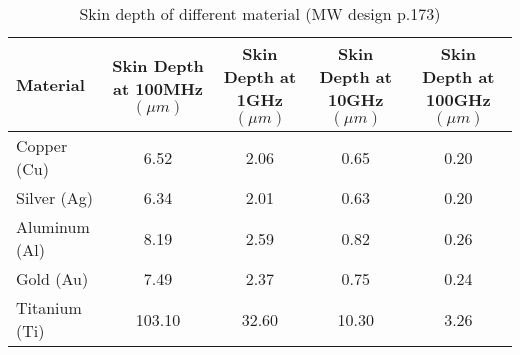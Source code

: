 \begin{table}
\caption{Skin depth of different material (MW design p.173)}
\begin{tabular}{l|c|c|c|c}
\toprule
Material & \makecell{Skin Depth\\at 100MHz $(\unit{\mu m})$} & \makecell{Skin Depth\\at 1GHz $(\unit{\mu m})$} & \makecell{Skin Depth\\at 10GHz $(\unit{\mu m})$} & \makecell{Skin Depth\\at 100GHz $(\unit{\mu m})$} \\
\midrule
\hline
Copper (Cu)   & 6.52   & 2.06  & 0.65  & 0.20 \\
Silver (Ag)   & 6.34   & 2.01  & 0.63  & 0.20 \\
Aluminum (Al) & 8.19   & 2.59  & 0.82  & 0.26 \\
Gold (Au)     & 7.49   & 2.37  & 0.75  & 0.24 \\
Titanium (Ti) & 103.10 & 32.60 & 10.30 & 3.26 \\
\bottomrule
\end{tabular}
\end{table}